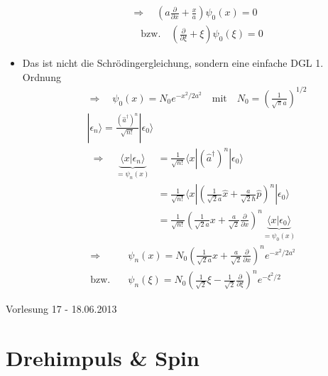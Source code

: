 \documentclass[10pt,article,colorback,accentcolor=tud9d]{scrartcl}
\begin{document}
\begin{itemize}
\begin{align}
    &\Rightarrow \quad \left(a\frac{\partial}{\partial x}+\frac{x}{a}\right)\psi_0(x)=0\\
    &\quad \text{bzw.} \quad \left(\frac{\partial}{\partial \xi}+\xi\right)\psi_0(\xi)=0
    \end{align}
  \item Das ist nicht die Schrödingergleichung, sondern eine einfache DGL 1. Ordnung
    \begin{align}
    &\Rightarrow \quad \psi_0(x)=N_0e^{-x^2/2a^2} \quad \text{mit}\quad N_0=\left(\frac{1}{\sqrt{\pi}a}\right)^{1/2}\\
    &|\epsilon_n\rangle=\frac{(\hat{a}^\dagger)^n}{\sqrt{n!}}|\epsilon_0\rangle
    \end{align}
    \begin{align}
    \Rightarrow \quad \underbrace{\langle x|\epsilon_n\rangle}_{=\psi_n(x)}&=\frac{1}{\sqrt{n!}}\langle x|(\hat{a}^\dagger)^n|\epsilon_0\rangle\\
    &=\frac{1}{\sqrt{n!}}\langle x|(\frac{1}{\sqrt{2}a}\hat{x}+\frac{a}{\sqrt{2}\hbar}\hat{p})^n|\epsilon_0\rangle\\
    &=\frac{1}{\sqrt{n!}}(\frac{1}{\sqrt{2}a}x+\frac{a}{\sqrt{2}}\frac{\partial}{\partial x})^n\underbrace{\langle x|\epsilon_0\rangle}_{=\psi_0(x)}
    \end{align}
    \begin{align}
    \Rightarrow &\psi_n(x)=N_0 (\frac{1}{\sqrt{2}a}x+\frac{a}{\sqrt{2}}\frac{\partial}{\partial x})^ne^{-x^2/2a^2}\\
    \text{bzw.}\quad &\psi_n(\xi)=N_0\left(\frac{1}{\sqrt{2}}\xi-\frac{1}{\sqrt{2}}\frac{\partial}{\partial\xi}\right)^ne^{-\xi^2/2}
    \end{align}
\end{itemize}



\begin{flushright}
Vorlesung 17 - 18.06.2013
\end{flushright}
\section{Drehimpuls \& Spin}
\end{document}
